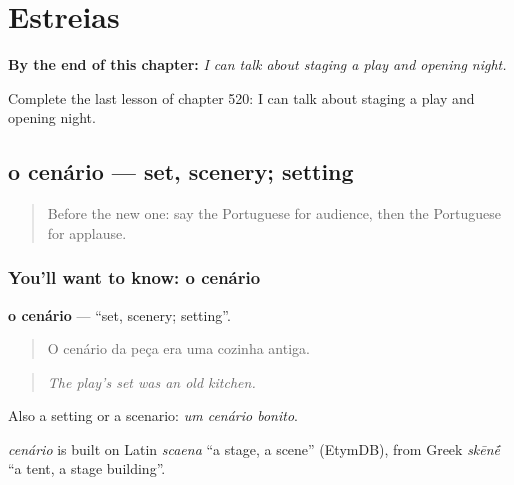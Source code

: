 
\chapter{Estreias}
\label{ch:pt-estreias}

\begin{chapteropening}
\textbf{By the end of this chapter:} \emph{I can talk about staging a play and opening night.}

Complete the last lesson of chapter 520: I can talk about staging a play and opening night.
\end{chapteropening}

\section[o cenário]{o cenário — set, scenery; setting}

\label{lesson:PT-C520-cenario}



\begin{quote}
Before the new one: say the Portuguese for audience, then the Portuguese for applause.
\end{quote}

\subsection*{You'll want to know: o cenário}
\textbf{o cenário} — \textquotedblleft{}set, scenery; setting\textquotedblright{}.

\begin{quote}
O cenário da peça era uma cozinha antiga.
\end{quote}

\begin{quote}
\emph{The play's set was an old kitchen.}
\end{quote}

Also a setting or a scenario: \emph{um cenário bonito}.

\begin{cousinweb}
\emph{cenário} is built on Latin \emph{scaena} \textquotedblleft{}a stage, a scene\textquotedblright{} (EtymDB), from Greek \emph{skēn\'{\={e}}} \textquotedblleft{}a tent, a stage building\textquotedblright{}.
\end{cousinweb}

